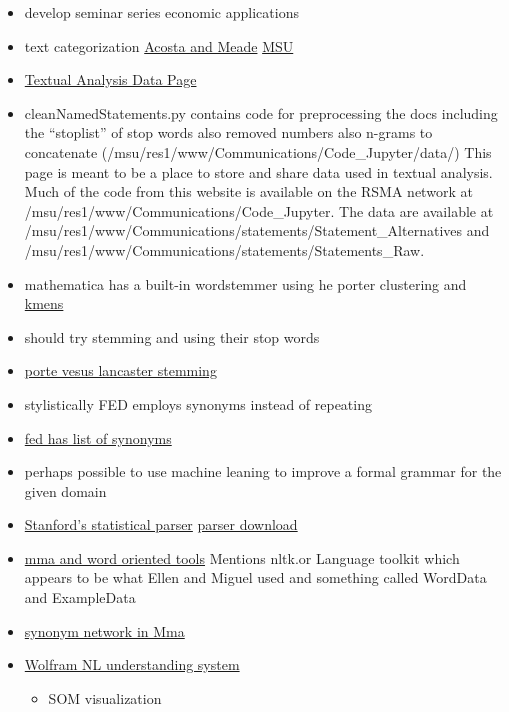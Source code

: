 \documentclass[hyperref]{labbook}
\begin{document}
\begin{itemize}
\item develop seminar series economic applications
\item text categorization \href{https://www.federalreserve.gov/econresdata/notes/feds-notes/2015/semantic-analysis-of-the-FOMCs-postmeeting-statement-20150930.html}{Acosta and Meade}
\href{https://spweb.frb.gov/sites/ma/msu/FedCommunications/Wiki/Textual%20Analysis/Textual%20Analysis.aspx}{MSU}
\item \href{https://spweb.frb.gov/sites/ma/msu/FedCommunications/Wiki/Textual%20Analysis/Textual%20Analysis%20Data.aspx}{Textual Analysis Data Page}
  \item cleanNamedStatements.py contains code for preprocessing the docs including the ``stoplist'' of stop words  also removed numbers also n-grams to concatenate  (/msu/res1/www/Communications/Code\_Jupyter/data/)
This page is meant to be a place to store and share data used in textual analysis.  Much of the code from this website is available on the RSMA network at /msu/res1/www/Communications/Code\_Jupyter.  The data are available at /msu/res1/www/Communications/statements/Statement\_Alternatives and /msu/res1/www/Communications/statements/Statements\_Raw.
\item mathematica has a built-in wordstemmer using he porter clustering and \href{http://mathematica.stackexchange.com/questions/7441/k-means-clustering}{kmens}
\item should try stemming and using their stop words
\item \href{http://stackoverflow.com/questions/10554052/what-are-the-major-differences-and-benefits-of-porter-and-lancaster-stemming-alg}{porte vesus lancaster stemming}
\item stylistically FED employs synonyms instead of repeating
\item \href{https://spweb.frb.gov/sites/ma/msu/_layouts/15/xlviewer.aspx?id=/sites/ma/msu/MSU_Resources/list%20of%20words%20(increase%20and%20decrease).xlsx}{fed has list of synonyms}
 \item perhaps possible to use machine leaning to improve a formal grammar for the given domain
 \item\href{https://nlp.stanford.edu/software/lex-parser.shtml}{Stanford's statistical parser} \href{https://nlp.stanford.edu/software/lex-parser.shtml#Download}{parser download}
 \item \href{http://community.wolfram.com/groups/-/m/t/79795?p_p_auth=nEpA5pB6}{mma and word oriented tools}  Mentions nltk.or Language toolkit which appears to be what Ellen and Miguel used and something called WordData and ExampleData
 \item \href{http://community.wolfram.com/groups/-/m/t/227651?sortMsg=Flat}{synonym network in Mma}
 \item \href{https://www.wolfram.com/natural-language-understanding/}{Wolfram NL understanding system}
  \begin{itemize}
\item SOM visualization
  \end{itemize}

\end{itemize}
\end{document}
